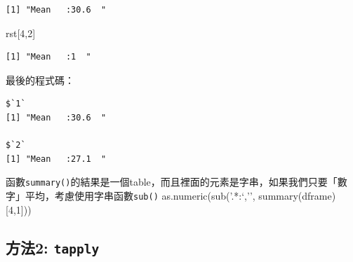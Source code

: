 \documentclass[]{book}
\newenvironment{Shaded}{\begin{snugshade}}{\end{snugshade}}
\newcommand{\ControlFlowTok}[1]{\textcolor[rgb]{0.13,0.29,0.53}{\textbf{#1}}}
\newcommand{\DecValTok}[1]{\textcolor[rgb]{0.00,0.00,0.81}{#1}}
\newcommand{\KeywordTok}[1]{\textcolor[rgb]{0.13,0.29,0.53}{\textbf{#1}}}
\newcommand{\NormalTok}[1]{#1}
\newcommand{\OperatorTok}[1]{\textcolor[rgb]{0.81,0.36,0.00}{\textbf{#1}}}
\newcommand{\StringTok}[1]{\textcolor[rgb]{0.31,0.60,0.02}{#1}}
\theoremstyle{definition}
\theoremstyle{definition}
\theoremstyle{definition}
\theoremstyle{remark}
\begin{document}
\begin{verbatim}
[1] "Mean   :30.6  "
\end{verbatim}

\begin{Shaded}
\begin{Highlighting}[]
\NormalTok{rst[}\DecValTok{4}\NormalTok{,}\DecValTok{2}\NormalTok{]}
\end{Highlighting}
\end{Shaded}

\begin{verbatim}
[1] "Mean   :1  "
\end{verbatim}

最後的程式碼：

\begin{Shaded}
\end{Shaded}

\begin{verbatim}
$`1`
[1] "Mean   :30.6  "

$`2`
[1] "Mean   :27.1  "
\end{verbatim}

函數\texttt{summary()}的結果是一個table，而且裡面的元素是字串，如果我們只要「數字」平均，考慮使用字串函數\texttt{sub()}
as.numeric(sub('.*:`,'', summary(dframe){[}4,1{]}))

\hypertarget{2-tapply}{%
\subsection{\texorpdfstring{方法2:
\texttt{tapply}}{方法2: tapply}}\label{2-tapply}}
\end{document}
